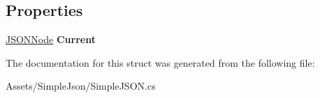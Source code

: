\subsection*{Properties}
\begin{DoxyCompactItemize}
\item 
\hyperlink{classSimpleJSON_1_1JSONNode}{J\+S\+O\+N\+Node} {\bfseries Current}\hypertarget{structSimpleJSON_1_1JSONNode_1_1KeyEnumerator_abd4d944463a621a242d2daa045fe9ceb}{}\label{structSimpleJSON_1_1JSONNode_1_1KeyEnumerator_abd4d944463a621a242d2daa045fe9ceb}

\end{DoxyCompactItemize}


The documentation for this struct was generated from the following file\+:\begin{DoxyCompactItemize}
\item 
Assets/\+Simple\+Json/Simple\+J\+S\+O\+N.\+cs\end{DoxyCompactItemize}
